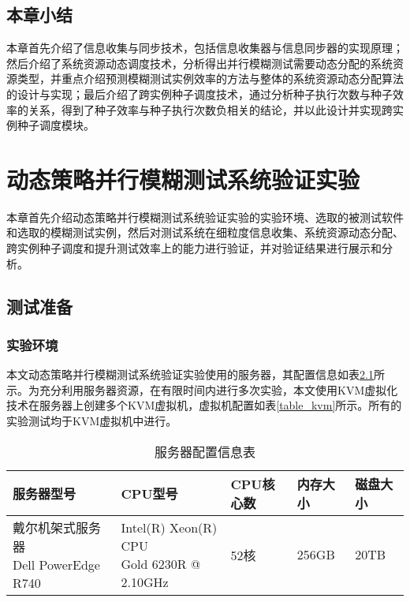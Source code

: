 \documentclass[master]{thesis-uestc}
\begin{document}
\section{本章小结}

本章首先介绍了信息收集与同步技术，包括信息收集器与信息同步器的实现原理；然后介绍了系统资源动态调度技术，分析得出并行模糊测试需要动态分配的系统资源类型，并重点介绍预测模糊测试实例效率的方法与整体的系统资源动态分配算法的设计与实现；最后介绍了跨实例种子调度技术，通过分析种子执行次数与种子效率的关系，得到了种子效率与种子执行次数负相关的结论，并以此设计并实现跨实例种子调度模块。 

\chapter{动态策略并行模糊测试系统验证实验}

本章首先介绍动态策略并行模糊测试系统验证实验的实验环境、选取的被测试软件和选取的模糊测试实例，然后对测试系统在细粒度信息收集、系统资源动态分配、跨实例种子调度和提升测试效率上的能力进行验证，并对验证结果进行展示和分析。

\section{测试准备}
\subsection{实验环境}

本文动态策略并行模糊测试系统验证实验使用的服务器，其配置信息如表\ref{table_server}所示。为充分利用服务器资源，在有限时间内进行多次实验，本文使用KVM虚拟化技术在服务器上创建多个KVM虚拟机，虚拟机配置如表\ref{table_kvm}所示。所有的实验测试均于KVM虚拟机中进行。

\begin{table}[!htbp]
    \caption{服务器配置信息表}
    \begin{tabular}{lllll}
    \toprule
    服务器型号 & CPU型号 & CPU核心数 & 内存大小 & 磁盘大小 \\
    \midrule
    \makecell[l]{戴尔机架式服务器 \\ Dell PowerEdge R740 }
 & \makecell[l]{Intel(R) Xeon(R) CPU \\ Gold 6230R @ 2.10GHz} & 52核 & 256GB & 20TB \\
    \bottomrule
    \end{tabular}
    \label{table_server}
    \vspace{6pt}
\end{table}
\end{document}
